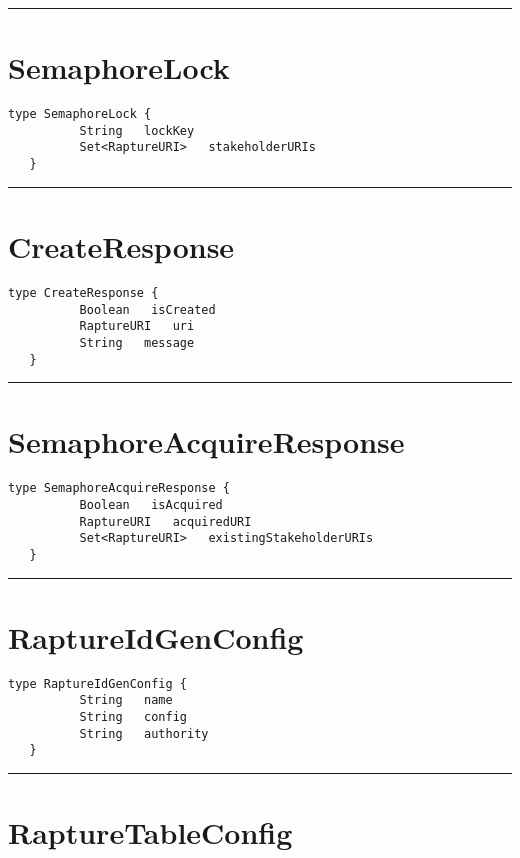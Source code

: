 \rule{12cm}{2pt}
\section{SemaphoreLock}
\label{type:SemaphoreLock}

\begin{lstlisting}[style=nonumbers]
   type SemaphoreLock {
          String   lockKey
          Set<RaptureURI>   stakeholderURIs
   }
\end{lstlisting}

\rule{12cm}{2pt}
\section{CreateResponse}
\label{type:CreateResponse}

\begin{lstlisting}[style=nonumbers]
   type CreateResponse {
          Boolean   isCreated
          RaptureURI   uri
          String   message
   }
\end{lstlisting}

\rule{12cm}{2pt}
\section{SemaphoreAcquireResponse}
\label{type:SemaphoreAcquireResponse}

\begin{lstlisting}[style=nonumbers]
   type SemaphoreAcquireResponse {
          Boolean   isAcquired
          RaptureURI   acquiredURI
          Set<RaptureURI>   existingStakeholderURIs
   }
\end{lstlisting}

\rule{12cm}{2pt}
\section{RaptureIdGenConfig}
\label{type:RaptureIdGenConfig}

\begin{lstlisting}[style=nonumbers]
   type RaptureIdGenConfig {
          String   name
          String   config
          String   authority
   }
\end{lstlisting}

\rule{12cm}{2pt}
\section{RaptureTableConfig}
\label{type:RaptureTableConfig}

